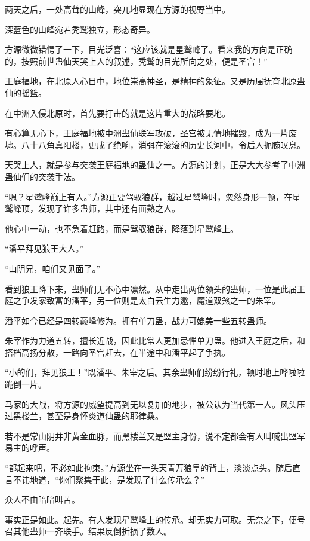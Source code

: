 
\begin{this_body}

两天之后，一处高耸的山峰，突兀地显现在方源的视野当中。

深蓝色的山峰宛若秃鹫独立，形态奇异。

方源微微错愕了一下，目光泛喜：“这应该就是星鹫峰了。看来我的方向是正确的，按照前世蛊仙天哭上人的叙述，秃鹫的目光所向之处，便是圣宫！”

王庭福地，在北原人心目中，地位崇高神圣，是精神的象征。又是历届抚育北原蛊仙的摇篮。

在中洲入侵北原时，首先要打击的就是这片重大的战略要地。

有心算无心下，王庭福地被中洲蛊仙联军攻破，圣宫被无情地摧毁，成为一片废墟。八十八角真阳楼，更成了绝响，消弭在滚滚的历史长河中，令后人扼腕叹息。

天哭上人，就是参与突袭王庭福地的蛊仙之一。方源的计划，正是大大参考了中洲蛊仙们的突袭手法。

“嗯？星鹫峰巅上有人。”方源正要驾驭狼群，越过星鹫峰时，忽然身形一顿，在星鹫峰顶，发现了许多蛊师，其中还有面熟之人。

他心中一动，也不急着赶路，而是驾驭狼群，降落到星鹫峰上。

“潘平拜见狼王大人。”

“山阴兄，咱们又见面了。”

看到狼王降下来，蛊师们无不心中凛然。从中走出两位领头的蛊师，一位是此届王庭之争发家致富的潘平，另一位则是太白云生力邀，魔道双煞之一的朱宰。

潘平如今已经是四转巅峰修为。拥有单刀蛊，战力可媲美一些五转蛊师。

朱宰作为力道五转，擅长近战，因此比常人更加忌惮单刀蛊。他进入王庭之后，和搭档高扬分散，一路向圣宫赶去，在半途中和潘平起了争执。

“小的们，拜见狼王！”既潘平、朱宰之后。其余蛊师们纷纷行礼，顿时地上哗啦啦跪倒一片。

马家的大战，将方源的威望提高到无以复加的地步，被公认为当代第一人。风头压过黑楼兰，甚至是身怀炎道仙蛊的耶律桑。

若不是常山阴并非黄金血脉，而黑楼兰又是盟主身份，说不定都会有人叫喊出盟军易主的呼声。

“都起来吧，不必如此拘束。”方源坐在一头天青万狼皇的背上，淡淡点头。随后直言不讳地道，“你们聚集于此，是发现了什么传承么？”

众人不由暗暗叫苦。

事实正是如此。起先。有人发现星鹫峰上的传承。却无实力可取。无奈之下，便号召其他蛊师一齐联手。结果反倒折损了数人。


\end{this_body}

